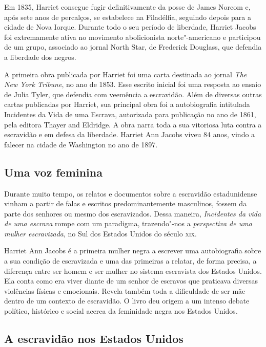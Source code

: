 \documentclass[12pt]{extarticle}
\begin{document}
Em 1835, Harriet consegue fugir definitivamente da posse de James Norcom
e, após sete anos de percalços, se estabelece na Filadélfia, seguindo
depois para a cidade de Nova Iorque. Durante todo o seu período de
liberdade, Harriet Jacobs foi extremamente ativa no movimento
abolicionista norte"-americano e participou de um grupo, associado ao
jornal North Star, de Frederick Douglass, que defendia a liberdade dos
negros.

A primeira obra publicada por Harriet foi uma carta destinada ao jornal
\emph{The New York Tribune}, no ano de 1853. Esse escrito inicial foi
uma resposta ao ensaio de Julia Tyler, que defendia com veemência a
escravidão. Além de diversas outras cartas publicadas por Harriet, sua
principal obra foi a autobiografia intitulada Incidentes da Vida de uma
Escrava, autorizada para publicação no ano de 1861, pela editora Thayer
and Eldridge. A obra narra toda a sua vitoriosa luta contra a escravidão
e em defesa da liberdade. Harriet Ann Jacobs viveu 84 anos, vindo a
falecer na cidade de Washington no ano de 1897.

\subsection{Uma voz feminina}

Durante muito tempo, os relatos e documentos sobre a escravidão
estadunidense vinham a partir de falas e escritos predominantemente
masculinos, fossem da parte dos senhores ou mesmo dos escravizados.
Dessa maneira, \emph{Incidentes da vida de uma escrava} rompe com um
paradigma, trazendo"-nos a \emph{perspectiva de uma mulher
escravizada}, no Sul dos Estados Unidos do século \textsc{xix}.

Harriet Ann Jacobs é a primeira mulher negra a escrever uma
autobiografia sobre a sua condição de escravizada e uma das primeiras a
relatar, de forma precisa, a diferença entre ser homem e ser mulher no
sistema escravista dos Estados Unidos. Ela conta como era viver diante
de um senhor de escravos que praticava diversas violências físicas e
emocionais. Revela também toda a dificuldade de ser mãe dentro de um
contexto de escravidão. O livro deu origem a um intenso debate político,
histórico e social acerca da feminidade negra nos Estados Unidos.

\subsection{A escravidão nos Estados Unidos}
\end{document}
